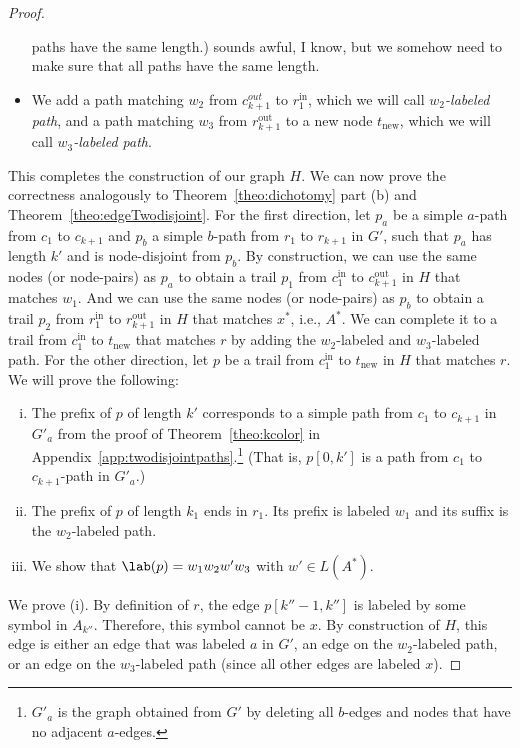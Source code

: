 \documentclass[a4paper,english]{lipics-v2016}
\theoremstyle{plain}
\newcommand{\tina}[1]{#1}
\begin{document}
\begin{proof}
\begin{itemize}
paths have the same length.) \tina{ sounds awful, I know, but we somehow need to make sure that all paths have the same length.}
\item We add a path matching $w_2$ from $c_{k+1}^{out}$ to $r_1^\text{in}$, which we will call \emph{$w_2$-labeled path}, and a path matching $w_3$ from $r_{k+1}^\text{out}$ to a new node $t_\text{new}$, which we will call \emph{$w_3$-labeled path}. 
\end{itemize}
This completes the construction of our graph $H$. We can now prove the correctness analogously to Theorem~\ref{theo:dichotomy} part (b) and Theorem~\ref{theo:edgeTwodisjoint}. 
For the first direction, let $p_a$ be a simple $a$-path from $c_1$ to $c_{k+1}$ and $p_b$ a simple $b$-path from $r_1$ to $r_{k+1}$ in $G'$, such that $p_a$ has length $k'$ and is node-disjoint from $p_b$. By construction, we can use the same nodes (or node-pairs) as $p_a$ to obtain a trail $p_1$ from $c_1^\text{in}$ to $c_{k+1}^\text{out}$ in $H$ that matches $w_1$. And we can use the same nodes (or node-pairs) as $p_b$ to obtain a trail $p_2$ from $r_1^\text{in}$ to $r_{k+1}^\text{out}$ in $H$ that matches $x^*$, i.e., $A^*$. We can complete it to a trail from $c_1^\text{in}$ to $t_\text{new}$ that matches $r$ by adding the $w_2$-labeled and $w_3$-labeled path.
For the other direction, let $p$ be a trail from $c_1^\text{in}$ to $t_\text{new}$ in $H$ that matches $r$. We will prove the following:
  \begin{enumerate}[(i)]
  \item The prefix of $p$ of length $k'$ corresponds to a simple path
    from $c_1$  to $c_{k+1}$ in $G'_a$ from the proof of
    Theorem~\ref{theo:kcolor} in
    Appendix~\ref{app:twodisjointpaths}.\footnote{$G'_a$ is the graph
      obtained from $G'$ by deleting all $b$-edges and nodes that have no adjacent $a$-edges.} (That is, $p[0,k']$ is a path
    from $c_1$ to $c_{k+1}$-path in $G'_a$.) 
  \item The prefix of $p$ of length $k_1$ ends in $r_1$. Its prefix
    is labeled $w_1$ and its suffix is the $w_2$-labeled path.
 \item We show that $\lab(p)=w_1w_2 w' w_3$ with $w' \in L(A^*)$. 
  \end{enumerate}
  We prove (i). By definition of $r$, the edge $p[k''-1,k'']$ is
  labeled by some symbol in $A_{k''}$. Therefore, this symbol cannot
  be $x$. By construction of $H$, this edge is either an edge that was
  labeled $a$ in $G'$, an edge on the $w_2$-labeled path, or an edge
  on the $w_3$-labeled path (since all other edges are labeled $x$).
  

\end{proof}
\end{document}
